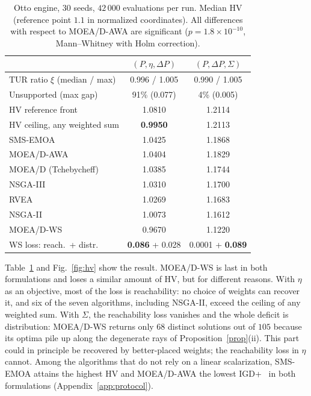 \documentclass[pre,twocolumn,superscriptaddress,nofootinbib,longbibliography]{revtex4-2}
\begin{document}
\begin{table}[t]
\caption{Otto engine, $30$ seeds, $42\,000$ evaluations per run. Median HV (reference point $1.1$
in normalized coordinates). All differences with respect to MOEA/D-AWA are significant
($p = 1.8\times10^{-10}$, Mann--Whitney with Holm correction).}
\label{tab:otto}
\begin{ruledtabular}
\footnotesize
\begin{tabular}{lcc}
 & $(P,\eta,\Delta P)$ & $(P,\Delta P,\Sigma)$ \\
\hline
TUR ratio $\xi$ (median / max) & 0.996 / 1.005 & 0.990 / 1.005 \\
Unsupported (max gap) & 91\% (0.077) & 4\% (0.005) \\
HV reference front & 1.0810 & 1.2114 \\
HV ceiling, any weighted sum & \textbf{0.9950} & 1.2113 \\
\hline
SMS-EMOA & 1.0425 & 1.1868 \\
MOEA/D-AWA & 1.0404 & 1.1829 \\
MOEA/D (Tchebycheff) & 1.0385 & 1.1744 \\
NSGA-III & 1.0310 & 1.1700 \\
RVEA & 1.0269 & 1.1683 \\
NSGA-II & 1.0073 & 1.1612 \\
MOEA/D-WS & 0.9670 & 1.1220 \\
\hline
WS loss: reach.\ + distr. & \textbf{0.086} + 0.028 & 0.0001 + \textbf{0.089}
\end{tabular}
\end{ruledtabular}
\end{table}

Table~\ref{tab:otto} and Fig.~\ref{fig:hv} show the result. MOEA/D-WS is last in both
formulations and loses a similar amount of HV, but for different reasons. With $\eta$ as an
objective, most of the loss is reachability: no choice of weights can recover it, and six of the
seven algorithms, including NSGA-II, exceed the ceiling of any weighted sum. With $\Sigma$, the
reachability loss vanishes and the whole deficit is distribution: MOEA/D-WS returns only $68$
distinct solutions out of $105$ because its optima pile up along the degenerate rays of
Proposition~\ref{prop}(ii). This part could in principle be recovered by better-placed weights;
the reachability loss in $\eta$ cannot. Among the algorithms that do not rely on a linear
scalarization, SMS-EMOA attains the highest HV and MOEA/D-AWA the lowest IGD+~\cite{Ishibuchi2015}
in both formulations (Appendix~\ref{app:protocol}).
\end{document}

